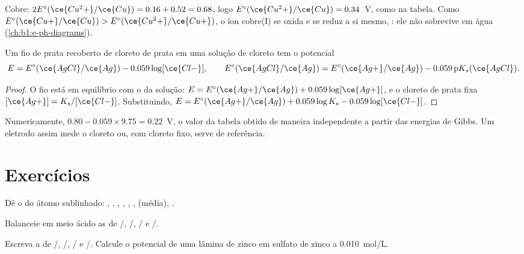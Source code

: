 Cobre: $2E^\circ(\ce{Cu^2+}/\ce{Cu}) = 0.16 + 0.52 = 0.68$, logo
$E^\circ(\ce{Cu^2+}/\ce{Cu}) = 0.34$~V, como na tabela. Como
$E^\circ(\ce{Cu+}/\ce{Cu}) > E^\circ(\ce{Cu^2+}/\ce{Cu+})$, o íon
cobre(I) se oxida e se reduz a si mesmo, : ele não
sobrevive em água (\cref{ch:b1:e-ph-diagrams}).

\begin{proposition}\label{prop:b1:nernst:second-kind}
Um fio de prata recoberto de cloreto de prata em uma solução de cloreto
tem o potencial
\[
  E = E^\circ(\ce{AgCl}/\ce{Ag}) - 0.059\log[\ce{Cl-}], \qquad
  E^\circ(\ce{AgCl}/\ce{Ag}) = E^\circ(\ce{Ag+}/\ce{Ag}) - 0.059\,\mathrm{p}K_s(\ce{AgCl}) .
\]
\end{proposition}

\begin{proof}
O fio está em equilíbrio com o  da solução:
$E = E^\circ(\ce{Ag+}/\ce{Ag}) + 0.059\log[\ce{Ag+}]$, e o cloreto de
prata fixa $[\ce{Ag+}] = K_s/[\ce{Cl-}]$. Substituindo,
$E = E^\circ(\ce{Ag+}/\ce{Ag}) + 0.059\log K_s - 0.059\log[\ce{Cl-}]$.
\end{proof}

Numericamente, $0.80 - 0.059 \times 9.75 = 0.22$~V, o valor da tabela
obtido de maneira independente a partir das energias de Gibbs. Um
eletrodo assim mede o cloreto ou, com cloreto fixo, serve de referência.

\section{Exercícios}

\begin{exercise}[$\star$]\label{exo:b1:nernst:1}
Dê o  do átomo sublinhado: ,
, , ,
, , 
(média), .
\end{exercise}

\begin{exercise}[$\star$]\label{exo:b1:nernst:2}
Balanceie em meio ácido as  de /,
/, / e /.
\end{exercise}

\begin{exercise}[$\star$]\label{exo:b1:nernst:3}
Escreva a  de /, /,
/ e /. Calcule o potencial de uma
lâmina de zinco em sulfato de zinco a \qty{0.010}{mol/L}.
\end{exercise}

